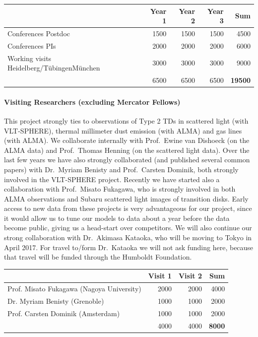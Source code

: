 \documentclass[10pt,fleqn,twoside]{article}
\begin{document}
\begin{center}
\begin{tabular}{l|r|r|r|r}
& Year 1 & Year 2 & Year 3 & Sum \\
\hline\hline
Conferences Postdoc                       	& 1500	& 1500 & 1500 & 4500\\
Conferences PIs                                 & 2000	& 2000 & 2000 & 6000\\
Working visits Heidelberg/T\"ubingenM\"unchen   & 3000	& 3000 & 3000 & 9000\\
\hline
  & 6500 & 6500 & 6500 & {\bf 19500}\\
\end{tabular}
\end{center}

\paragraph{Visiting Researchers (excluding Mercator Fellows)}
This project strongly ties to observations of Type 2 TDs in scattered light
(with VLT-SPHERE), thermal millimeter dust emission (with ALMA) and gas
lines (with ALMA). We collaborate internally with Prof.~Ewine van Dishoeck
(on the ALMA data) and Prof.~Thomas Henning (on the scattered light data).
Over the last few years we have also strongly collaborated (and published
several common papers) with Dr.~Myriam Benisty and Prof.~Carsten Dominik,
both strongly involved in the VLT-SPHERE project. Recently we have started
also a collaboration with Prof.~Misato Fukagawa, who is strongly involved in
both ALMA observations and Subaru scattered light images of transition
disks. Early access to new data from these projects is very advantageous for
our project, since it would allow us to tune our models to data about a year
before the data become public, giving us a head-start over competitors.  We
will also continue our strong collaboration with Dr.~Akimasa Kataoka, who
will be moving to Tokyo in April 2017. For travel to/form Dr.~Kataoka we
will not ask funding here, because that travel will be funded through the
Humboldt Foundation.
\begin{center}
\begin{tabular}{l|r|r|r}
& Visit 1 & Visit 2 & Sum \\
\hline\hline
Prof. Misato Fukagawa (Nagoya University)  & 2000 & 2000 & 4000 \\
Dr. Myriam Benisty (Grenoble)              & 1000 & 1000 & 2000 \\
Prof. Carsten Dominik (Amsterdam)          & 1000 & 1000 & 2000 \\
\hline
  & 4000 & 4000 & {\bf 8000}\\
\end{tabular}
\end{center}
\end{document}
